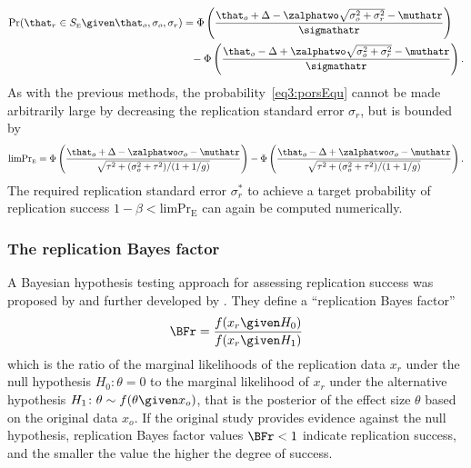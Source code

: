 \begin{align}
  \label{eq3:porsEqu}
  \Pr(\that_{r} \in S_{\scriptscriptstyle \text{E}} \given \that_{o}, \sigma_{o}, \sigma_{r})
  &= %
    \Phi\left(\frac{\that_{o} + \Delta - \zalphatwo
  \sqrt{\sigma^{2}_{o} + \sigma^{2}_{r}} -\muthatr}{\sigmathatr}\right) \nonumber \\
&\phantom{=} -
  \Phi\left(\frac{\that_{o} - \Delta + \zalphatwo
  \sqrt{\sigma^{2}_{o} + \sigma^{2}_{r}} -\muthatr}{\sigmathatr}\right).
\end{align}
As with the previous methods, the probability~\eqref{eq3:porsEqu} cannot be made
arbitrarily large by decreasing the replication standard error $\sigma_{r}$, but
is bounded by
\begin{align*}
  \text{limPr}_{\scriptscriptstyle \text{E}} =
  \Phi\left(\frac{\that_{o} + \Delta - \zalphatwo\sigma_{o}
  -\muthatr}{\sqrt{\tau^{2} + (\sigma^{2}_{o} + \tau^{2})/(1 + 1/g)}}\right)
  -\Phi\left(\frac{\that_{o} - \Delta + \zalphatwo\sigma_{o}
  -\muthatr}{\sqrt{\tau^{2} + (\sigma^{2}_{o} + \tau^{2})/(1 + 1/g)}}\right).
\end{align*}
The required replication standard error $\sigma_{r}^{*}$ to achieve a target
probability of replication success
$1 - \beta < \text{limPr}_{\scriptscriptstyle \text{E}}$ can again be computed
numerically.

\subsubsection{The replication Bayes factor}
A Bayesian hypothesis testing approach for assessing replication success was
proposed by \citet{Verhagen2014} and further developed by \citet{Ly2018}. They
define a ``replication Bayes factor''
\begin{align*}
  \BFr = \frac{f(x_{r} \given H_{0})}{f(x_{r} \given H_{1})}
\end{align*}
which is the ratio of the marginal likelihoods of the replication data $x_{r}$
under the null hypothesis $H_{0} \colon \theta = 0$ to the marginal likelihood
of $x_{r}$ under the alternative hypothesis
$H_{1} \colon \theta \sim f(\theta \given x_{o})$, that is the posterior of the
effect size $\theta$ based on the original data $x_{o}$. If the original study
provides evidence against the null hypothesis, replication Bayes factor values
$\BFr < 1$ indicate replication success, and the smaller the value the higher
the degree of success.

